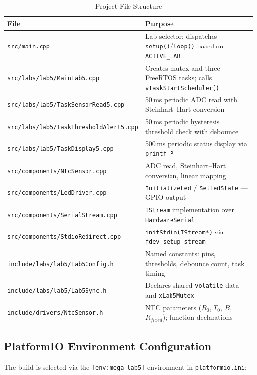 \documentclass[12pt]{article}
\begin{document}
\begin{table}[H]
\centering
\begin{tabular}{@{}lp{8.2cm}@{}}
\toprule
\textbf{File} & \textbf{Purpose} \\
\midrule
\texttt{src/main.cpp}
  & Lab selector; dispatches \texttt{setup()}/\texttt{loop()} based on \texttt{ACTIVE\_LAB} \\
\texttt{src/labs/lab5/MainLab5.cpp}
  & Creates mutex and three FreeRTOS tasks; calls \texttt{vTaskStartScheduler()} \\
\texttt{src/labs/lab5/TaskSensorRead5.cpp}
  & 50\,ms periodic ADC read with Steinhart--Hart conversion \\
\texttt{src/labs/lab5/TaskThresholdAlert5.cpp}
  & 50\,ms periodic hysteresis threshold check with debounce \\
\texttt{src/labs/lab5/TaskDisplay5.cpp}
  & 500\,ms periodic status display via \texttt{printf\_P} \\
\texttt{src/components/NtcSensor.cpp}
  & ADC read, Steinhart--Hart conversion, linear mapping \\
\texttt{src/components/LedDriver.cpp}
  & \texttt{InitializeLed} / \texttt{SetLedState} --- GPIO output \\
\texttt{src/components/SerialStream.cpp}
  & \texttt{IStream} implementation over \texttt{HardwareSerial} \\
\texttt{src/components/StdioRedirect.cpp}
  & \texttt{initStdio(IStream*)} via \texttt{fdev\_setup\_stream} \\
\texttt{include/labs/lab5/Lab5Config.h}
  & Named constants: pins, thresholds, debounce count, task timing \\
\texttt{include/labs/lab5/Lab5Sync.h}
  & Declares shared \texttt{volatile} data and \texttt{xLab5Mutex} \\
\texttt{include/drivers/NtcSensor.h}
  & NTC parameters (\(R_0\), \(T_0\), \(B\), \(R_{fixed}\)); function declarations \\
\bottomrule
\end{tabular}
\caption{Project File Structure}
\label{tab:files}
\end{table}

\subsection{PlatformIO Environment Configuration}

The build is selected via the \texttt{[env:mega\_lab5]} environment in \texttt{platformio.ini}:
\end{document}
